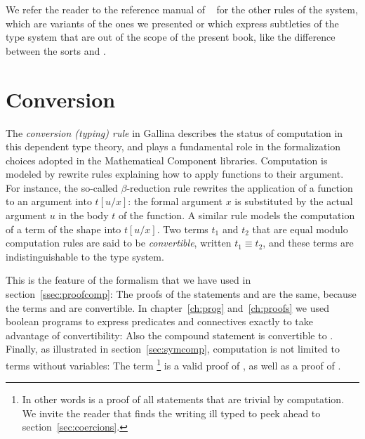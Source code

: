 We refer the reader
to the reference manual of \Coq{}~\cite{Coq:manual} for the other
rules of the system, which are variants of the ones we presented or
which express subtleties of the type system that are out of the scope of
the present book, like the difference between the sorts  and
.





\section{Conversion}\label{sec:conv}
The \emph{conversion (typing) rule} in Gallina describes the status of
computation in this dependent type theory, and plays a fundamental
role in the formalization choices adopted in the Mathematical
Component libraries. Computation is modeled by rewrite rules explaining how to
apply functions to their argument. For instance, the so-called
$\beta$-reduction rule rewrites the application of a function to
an argument  into $t[u/x]$: the formal argument
$x$ is substituted by the actual argument $u$ in the body $t$ of the
function. A similar rule models the computation of a term of
the shape  into $t[u/x]$. Two terms
$t_1$ and $t_2$ that are equal modulo computation rules are said to be
\emph{convertible}, written $t_1{}\equiv{}t_2$, and these terms
are indistinguishable to the type
system. 



 This is the feature of the formalism that we
have used in section~\ref{ssec:proofcomp}: The proofs of the
statements  and  are the same, because the terms
 and  are convertible.  In chapter~\ref{ch:prog} and~\ref{ch:proofs}
we used boolean programs to express predicates and connectives exactly
to take advantage of convertibility: Also the compound
statement
 is convertible to .
Finally, as illustrated in
section~\ref{sec:symcomp}, computation is not limited to terms without
variables: The term \footnote{In other words  is a proof of all statements that are trivial by computation. We invite the reader that finds the writing  ill typed to peek ahead to section~\ref{sec:coercions}.} is a valid proof of
, as well as a proof of .

